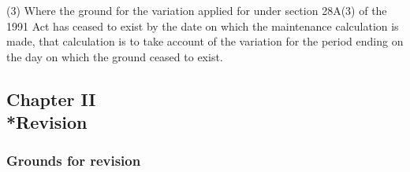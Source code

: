 \documentclass[12pt,a4paper]{article}
\begin{document}
(3) Where the ground for the variation applied for under section 28A(3) of the 1991 Act has ceased to exist by the date on which the maintenance calculation is made, that calculation is to take account of the variation for the period ending on the day on which the ground ceased to exist.

\subsection[Chapter II --- Revision]{Chapter II\\*Revision}

\renewcommand\parthead{--- Part III Chapter II}

\subsubsection[14. Grounds for revision]{Grounds for revision}
\end{document}
